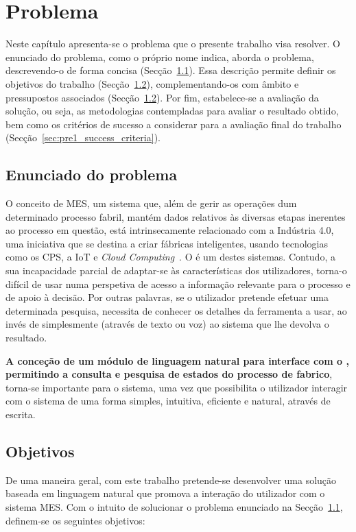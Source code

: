 \chapter{Problema}
\label{chap:pre1}

Neste capítulo apresenta-se o problema que o presente trabalho visa resolver. O enunciado do problema, como o próprio nome indica, aborda o problema, descrevendo-o de forma concisa (Secção~\ref{sec:pre1_problem}). Essa descrição permite definir os objetivos do trabalho (Secção~\ref{sec:pre1_objectives}), complementando-os com âmbito e pressupostos associados (Secção~\ref{sec:pre1_objectives}). Por fim, estabelece-se a avaliação da solução, ou seja, as metodologias contempladas para avaliar o resultado obtido, bem como os critérios de sucesso a considerar para a avaliação final do trabalho (Secção~\ref{sec:pre1_success_criteria}).

\section{Enunciado do problema}
\label{sec:pre1_problem}

O conceito de \gls{MES}, um sistema que, além de gerir as operações dum determinado processo fabril, mantém dados relativos às diversas etapas inerentes ao processo em questão, está intrinsecamente relacionado com a Indústria 4.0, uma iniciativa que se destina a criar fábricas inteligentes, usando tecnologias como os \gls{CPS}, a \gls{IoT} e \textit{Cloud Computing}~\parencite{intelligent_manufacturing_context_industry40_review}. O {\productname} é um destes sistemas. Contudo, a sua incapacidade parcial de adaptar-se às características dos utilizadores, torna-o difícil de usar numa perspetiva de acesso a informação relevante para o processo e de apoio à decisão. Por outras palavras, se o utilizador pretende efetuar uma determinada pesquisa, necessita de conhecer os detalhes da ferramenta a usar, ao invés de simplesmente  (através de texto ou voz) ao sistema que lhe devolva o resultado.

\textbf{A conceção de um módulo de linguagem natural para interface com o {\productname}, permitindo a consulta e pesquisa de estados do processo de fabrico}, torna-se importante para o sistema, uma vez que possibilita o utilizador interagir com o sistema de uma forma simples, intuitiva, eficiente e natural, através de escrita.

\section{Objetivos}
\label{sec:pre1_objectives}
De uma maneira geral, com este trabalho pretende-se desenvolver uma solução baseada em linguagem natural que promova a interação do utilizador com o sistema \gls{MES}. Com o intuito de solucionar o problema enunciado na Secção~\ref{sec:pre1_problem}, definem-se os seguintes objetivos:

